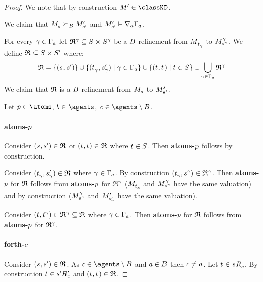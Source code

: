 \begin{proof}
We note that by construction $\kModelP \in \classKD$.

We claim that $\kPModel{\kStateS} \simulatesBs \kPModelP{\kStateSP}$ and $\kPModelP{\kStateSP} \entails \coversA \Gamma_\agentA$.

For every $\gamma \in \Gamma_\agentA$ let $\refinement^\gamma \subseteq \kStates \times \kStates[\gamma]$ be a $\agentsB$-refinement from $\kPModel{\kStateT_\gamma}$ to $\kPModel[\gamma]{\kStateS[\gamma]}$.
We define $\refinement \subseteq \kStates \times \kStatesP$ where:
$$
\refinement = \{(\kStateS, \kStateSP)\} \cup \{(\kStateT_\gamma, \kStateSP_\gamma) \mid \gamma \in \Gamma_\agentA\} \cup \{(\kStateT, \kStateT) \mid \kStateT \in \kStates\} \cup \bigcup_{\gamma \in \Gamma_\agentA} \refinement^\gamma
$$
We claim that $\refinement$ is a $\agentsB$-refinement from $\kPModel{\kStateS}$ to $\kPModelP{\kStateSP}$.

Let $\atomP \in \atoms$, $\agentB \in \agents$, $\agentC \in \agents \setminus \agentsB$.

\paragraph{atoms-$\atomP$}
Consider $(\kStateS, \kStateSP) \in \refinement$ or $(\kStateT, \kStateT) \in \refinement$ where $\kStateT \in \kStates$.
Then {\bf atoms-$\atomP$} follows by construction.

Consider $(\kStateT_\gamma, \kStateSP_\gamma) \in \refinement$ where $\gamma \in \Gamma_\agentA$.
By construction $(\kStateT_\gamma, \kStateS[\gamma]) \in \refinement^\gamma$.
Then {\bf atoms-$\atomP$} for $\refinement$ follows from {\bf atoms-$\atomP$} for $\refinement^\gamma$ ($\kPModel{\kStateT_\gamma}$ and $\kPModel[\gamma]{\kStateS[\gamma]}$ have the same valuation) and by construction ($\kPModel[\gamma]{\kStateS[\gamma]}$ and $\kPModelP{\kStateSP_\gamma}$ have the same valuation).

Consider $(\kStateT, \kStateT[\gamma]) \in \refinement^\gamma \subseteq \refinement$ where $\gamma \in \Gamma_\agentA$.
Then {\bf atoms-$\atomP$} for $\refinement$ follows from {\bf atoms-$\atomP$} for $\refinement^\gamma$.

\paragraph{forth-$\agentC$}
Consider $(\kStateS, \kStateSP) \in \refinement$.
As $\agentC \in \agents \setminus \agentsB$ and $\agentA \in \agentsB$ then $\agentC \neq \agentA$.
Let $\kStateT \in \kSuccessorsC{\kStateS}$.
By construction $\kStateT \in \kSuccessorsPC{\kStateSP}$ and $(\kStateT, \kStateT) \in \refinement$.


\end{proof}
